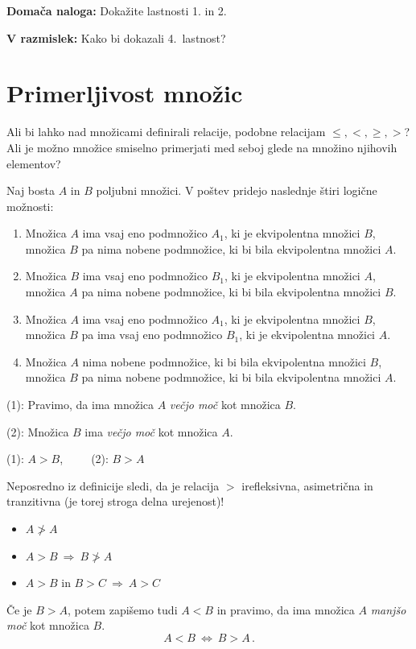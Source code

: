 \documentclass[11pt,paper=b5,DIV=13,headinclude,footinclude]{scrbook}
\def\sledi {{~\Rightarrow~}}
\def\cee {{~\Leftrightarrow~}}
\begin{document}
\textbf{Domača naloga:} Dokažite lastnosti 1. in 2.

\textbf{V razmislek:} Kako bi dokazali 4.~lastnost?


\section{Primerljivost množic}
Ali bi lahko nad množicami definirali relacije, podobne relacijam
$\le , <, \ge, >$? Ali je možno množice smiselno primerjati med seboj
glede na množino njihovih elementov?

\bigskip
Naj bosta $A$ in $B$ poljubni množici. V poštev pridejo naslednje štiri logične možnosti:
\begin{enumerate}[(1)]
  \item Množica $A$ ima vsaj eno podmnožico $A_1$, ki je ekvipolentna množici $B$, množica $B$
  pa nima nobene podmnožice, ki bi bila ekvipolentna množici $A$.
  \item Množica $B$ ima vsaj eno podmnožico $B_1$, ki je ekvipolentna množici $A$,
  množica $A$  pa nima nobene podmnožice, ki bi bila ekvipolentna množici $B$.
  \item Množica $A$ ima vsaj eno podmnožico $A_1$, ki je ekvipolentna množici $B$,
  množica $B$
  pa ima vsaj eno podmnožico $B_1$, ki je ekvipolentna množici $A$.
  \item Množica $A$ nima nobene podmnožice, ki bi bila ekvipolentna množici $B$,
  množica $B$ pa nima nobene podmnožice, ki bi bila ekvipolentna množici $A$.
\end{enumerate}

(1): Pravimo, da ima množica $A$ {\em večjo moč} kot množica $B$.

(2): Množica $B$ ima {\em večjo moč} kot množica $A$.

(1): $A>B$,~~~~~(2): $B>A$

\bigskip
Neposredno iz definicije sledi, da je relacija $>$
irefleksivna, asimetrična in tranzitivna (je torej stroga delna urejenost)!
\begin{itemize}
  \item $A\ngtr A$
  \item $A>B\sledi B\ngtr A$
  \item $A>B$ in $B>C\sledi A> C$
\end{itemize}

Če je $B>A$, potem zapišemo tudi $A<B$ in pravimo, da ima množica
$A$ {\em manjšo moč} kot množica $B$.
$$A<B\cee B>A\,.$$
\end{document}
